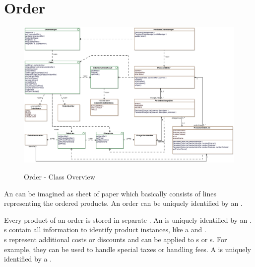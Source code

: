 \newpage
\section{Order}
\begin{figure}
	\centering
  \includegraphics[width=1.0\textwidth]{images/Order_Overview.eps}
	\label{order_overview}
	\caption{Order - Class Overview}
\end{figure}

An  can be imagined as sheet of paper which basically consists of lines representing the ordered products.
An order can be uniquely identified by an .

Every product of an order is stored in separate .
An  is uniquely identified by an .
s contain all information to identify product instances, like a  and .
\\

s represent additional costs or discounts and can be applied to s or s. 
For example, they can be used to handle special taxes or handling fees.
A  is uniquely identified by a .
\\


